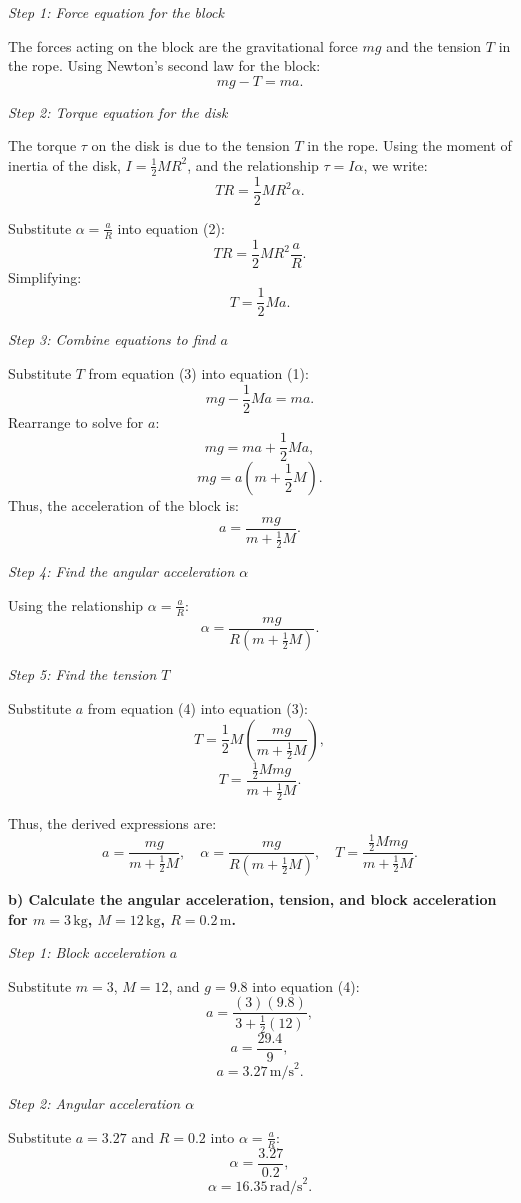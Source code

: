 \documentclass{article}
\begin{document}
\textit{Step 1: Force equation for the block}

The forces acting on the block are the gravitational force $mg$ and the tension $T$ in the rope. Using Newton's second law for the block:
\[
mg - T = ma. \tag{1}
\]

\textit{Step 2: Torque equation for the disk}

The torque $\tau$ on the disk is due to the tension $T$ in the rope. Using the moment of inertia of the disk, $I = \frac{1}{2}MR^2$, and the relationship $\tau = I\alpha$, we write:
\[
TR = \frac{1}{2}MR^2\alpha. \tag{2}
\]

Substitute $\alpha = \frac{a}{R}$ into equation (2):
\[
TR = \frac{1}{2}MR^2\frac{a}{R}.
\]
Simplifying:
\[
T = \frac{1}{2}Ma. \tag{3}
\]

\textit{Step 3: Combine equations to find $a$}

Substitute $T$ from equation (3) into equation (1):
\[
mg - \frac{1}{2}Ma = ma.
\]
Rearrange to solve for $a$:
\[
mg = ma + \frac{1}{2}Ma,
\]
\[
mg = a\left(m + \frac{1}{2}M\right).
\]
Thus, the acceleration of the block is:
\[
a = \frac{mg}{m + \frac{1}{2}M}. \tag{4}
\]

\textit{Step 4: Find the angular acceleration $\alpha$}

Using the relationship $\alpha = \frac{a}{R}$:
\[
\alpha = \frac{mg}{R\left(m + \frac{1}{2}M\right)}. \tag{5}
\]

\textit{Step 5: Find the tension $T$}

Substitute $a$ from equation (4) into equation (3):
\[
T = \frac{1}{2}M\left(\frac{mg}{m + \frac{1}{2}M}\right),
\]
\[
T = \frac{\frac{1}{2}Mmg}{m + \frac{1}{2}M}. \tag{6}
\]

Thus, the derived expressions are:
\[
a = \frac{mg}{m + \frac{1}{2}M}, \quad \alpha = \frac{mg}{R\left(m + \frac{1}{2}M\right)}, \quad T = \frac{\frac{1}{2}Mmg}{m + \frac{1}{2}M}.
\]

\textbf{b) Calculate the angular acceleration, tension, and block acceleration for $m = 3\,\text{kg}$, $M = 12\,\text{kg}$, $R = 0.2\,\text{m}$.}

\textit{Step 1: Block acceleration $a$}

Substitute $m = 3$, $M = 12$, and $g = 9.8$ into equation (4):
\[
a = \frac{(3)(9.8)}{3 + \frac{1}{2}(12)},
\]
\[
a = \frac{29.4}{9},
\]
\[
a = 3.27\,\text{m/s}^2.
\]

\textit{Step 2: Angular acceleration $\alpha$}

Substitute $a = 3.27$ and $R = 0.2$ into $\alpha = \frac{a}{R}$:
\[
\alpha = \frac{3.27}{0.2},
\]
\[
\alpha = 16.35\,\text{rad/s}^2.
\]
\end{document}
